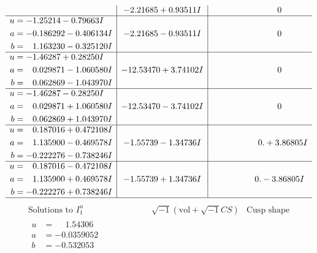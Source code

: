 \documentclass[1p]{elsarticle_modified}
\theoremstyle{definition}
\newcommand{\I}{\sqrt{-1}}
\begin{document}
$$\begin{array}{c|c|c}
 & -2.21685 + 0.93511 I & \phantom{-0.000000 } 0 \\ \hline\begin{aligned}
u &= -1.25214 - 0.79663 I \\
a &= -0.186292 - 0.406134 I \\
b &= \phantom{-}1.163230 - 0.325120 I\end{aligned}
 & -2.21685 - 0.93511 I & \phantom{-0.000000 } 0 \\ \hline\begin{aligned}
u &= -1.46287 + 0.28250 I \\
a &= \phantom{-}0.029871 - 1.060580 I \\
b &= \phantom{-}0.062869 - 1.043970 I\end{aligned}
 & -12.53470 + 3.74102 I & \phantom{-0.000000 } 0 \\ \hline\begin{aligned}
u &= -1.46287 - 0.28250 I \\
a &= \phantom{-}0.029871 + 1.060580 I \\
b &= \phantom{-}0.062869 + 1.043970 I\end{aligned}
 & -12.53470 - 3.74102 I & \phantom{-0.000000 } 0 \\ \hline\begin{aligned}
u &= \phantom{-}0.187016 + 0.472108 I \\
a &= \phantom{-}1.135900 - 0.469578 I \\
b &= -0.222276 - 0.738246 I\end{aligned}
 & -1.55739 - 1.34736 I & \phantom{-0.000000 -}0. + 3.86805 I \\ \hline\begin{aligned}
u &= \phantom{-}0.187016 - 0.472108 I \\
a &= \phantom{-}1.135900 + 0.469578 I \\
b &= -0.222276 + 0.738246 I\end{aligned}
 & -1.55739 + 1.34736 I & \phantom{-0.000000 } 0. - 3.86805 I\\
 \hline 
 \end{array}$$\newpage$$\begin{array}{c|c|c}  
\text{Solutions to }I^u_{1}& \I (\text{vol} + \sqrt{-1}CS) & \text{Cusp shape}\\
 \hline 
\begin{aligned}
u &= \phantom{-}1.54306\phantom{ +0.000000I} \\
a &= -0.0359052\phantom{ +0.000000I} \\
b &= -0.532053\phantom{ +0.000000I}\end{aligned}

\end{array}$$
\end{document}
